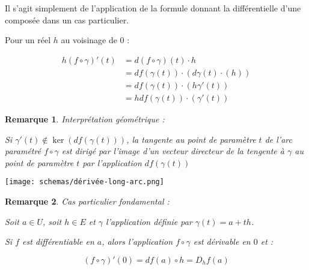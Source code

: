 \documentclass[a4paper,12pt]{book}
\newcommand{\Pre}[1]{\begin{tcolorbox}[sharp corners, colback=white,colframe=green!60!green!30!black!75, title=Preuve]#1\end{tcolorbox}}
\newtheorem{Rem}{Remarque}[section]
\begin{document}
\Pre{Il s'agit simplement de l'application de la formule donnant la différentielle d'une composée dans un cas particulier.
\par Pour un réel $h$ au voisinage de $0$ :
\par \begin{align*}h(f\circ\gamma)'(t)&=d(f\circ\gamma)(t)\cdot h\\
&= df(\gamma(t))\cdot (d\gamma(t)\cdot(h))\\
&= df(\gamma(t))\cdot(h\gamma'(t))\\
&= hdf(\gamma(t))\cdot(\gamma'(t))\end{align*}}
\begin{Rem}
Interprétation géométrique :
\par Si $\gamma'(t)\notin\ker(df(\gamma(t)))$, la tangente au point de paramètre $t$ de l'arc paramétré $f\circ\gamma$ est dirigé par l'image d'un vecteur directeur de la tengente à $\gamma$ au point de paramètre $t$ par l'application $df(\gamma(t))$
\end{Rem}
\texttt{[image: schemas/dérivée-long-arc.png]}
\begin{Rem}
Cas particulier fondamental :
\par Soit $a\in U$, soit $h\in E$ et $\gamma$ l'application définie par $\gamma(t) = a+th$.
\par Si $f$ est différentiable en $a$, alors l'application $f\circ\gamma$ est dérivable en $0$ et :
\par $$(f\circ\gamma)'(0) =df(a)\circ h=D_hf(a)$$  
\end{Rem}
\end{document}
